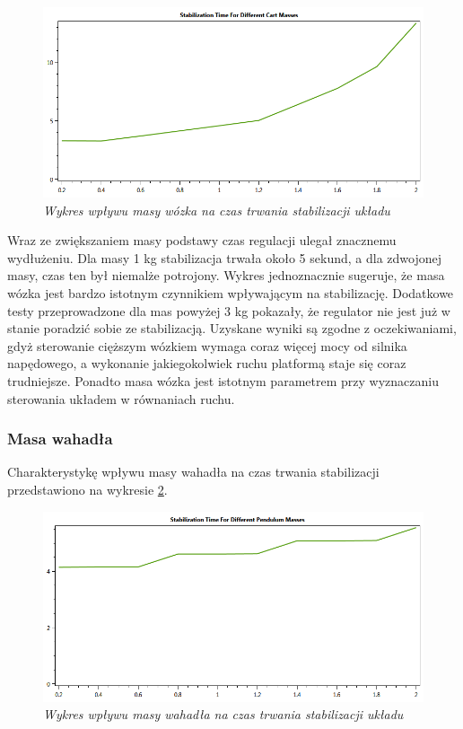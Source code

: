 \documentclass[12pt, twoside, openany]{report}
\theoremstyle{definition}
\begin{document}
\begin{figure}[H]
	\centering
		\includegraphics[width = 350pt]{CartMassQuality} 
		\caption{\textit{Wykres wpływu masy wózka na czas trwania stabilizacji układu}}
		\label{plot:CartMassQuality}
\end{figure}

Wraz ze zwiększaniem masy podstawy czas regulacji ulegał znacznemu wydłużeniu. Dla masy 1 kg stabilizacja trwała około 5 sekund, a dla zdwojonej masy, czas ten był niemalże potrojony. Wykres jednoznacznie sugeruje, że masa wózka jest bardzo istotnym czynnikiem wpływającym na stabilizację. Dodatkowe testy przeprowadzone dla mas powyżej 3 kg pokazały, że regulator nie jest już w stanie poradzić sobie ze stabilizacją. Uzyskane wyniki są zgodne z oczekiwaniami, gdyż sterowanie cięższym wózkiem wymaga coraz więcej mocy od silnika napędowego, a wykonanie jakiegokolwiek ruchu platformą staje się coraz trudniejsze. Ponadto masa wózka jest istotnym parametrem przy wyznaczaniu sterowania układem w równaniach ruchu. 

\newpage
\subsubsection{Masa wahadła}
Charakterystykę wpływu masy wahadła na czas trwania stabilizacji przedstawiono na wykresie \ref{plot:PendulumMassQuality}.
\begin{figure}[H]
	\centering
		\includegraphics[width = 350pt]{PendulumMassQuality} 
		\caption{\textit{Wykres wpływu masy wahadła na czas trwania stabilizacji układu}}
		\label{plot:PendulumMassQuality}
\end{figure}
\end{document}
